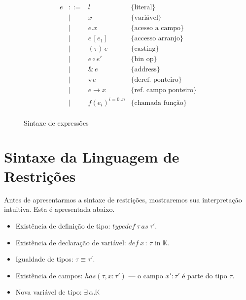 \documentclass[a4paper,8pt]{article}
\begin{document}
    \begin{figure}[h]
       \[
         \begin{array}{lcll}
           e & ::= & l & \{\text{literal}\} \\
             & \mid & x & \{\text{variável}\} \\
             & \mid & e . x & \{\text{acesso a campo}\}\\
             & \mid & e\,[e_1] & \{\text{accesso arranjo}\} \\
             & \mid & (\tau)\,e & \{\text{casting}\} \\
             &\mid & e\circ e' & \{\text{bin op}\} \\
             & \mid & \&\,e & \{\text{address}\} \\
             & \mid & \star\,e & \{\text{deref. ponteiro}\}\\
             & \mid & e \to x & \{\text{ref. campo ponteiro}\}\\
             & \mid & f(e_i)^{i=0..n} & \{\text{chamada função}\}\\
         \end{array} \]
         \centering
         \caption{Sintaxe de expressões}
         \label{exprsyn}
    \end{figure}



     \section{Sintaxe da Linguagem de Restrições}\label{constraintsyn}

     Antes de apresentarmos a sintaxe de restrições, mostraremos sua
     interpretação intuitiva. Esta é apresentada abaixo.

       \begin{itemize}
           \item Existência de definição de tipo: $typedef\:\tau\:as\:\tau'$.
           \item Existência de declaração de variável:
             $def\:x\,:\,\tau \text{ in } \mathbb{K}$.
           \item Igualdade de tipos: $\tau \equiv \tau'$.
	   \item Existência de campos: $has(\tau,x:\tau')$ --- o campo $x'
             : \tau'$ é parte do tipo $\tau$.
           \item Nova variável de tipo: $\exists \,\alpha. \mathbb{K}$
       \end{itemize}
\end{document}
